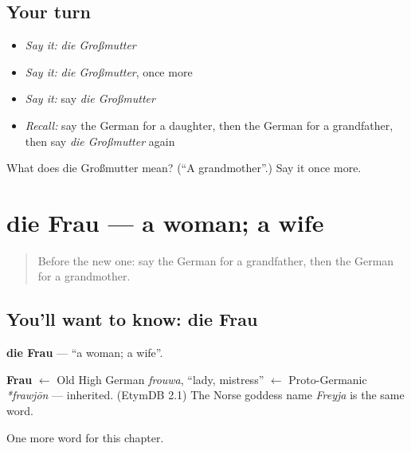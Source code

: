 \subsection*{Your turn}
\begin{itemize}
\raggedright
  \item \emph{Say it:} \emph{die Großmutter}
  \item \emph{Say it:} \emph{die Großmutter}, once more
  \item \emph{Say it:} say \emph{die Großmutter}
  \item \emph{Recall:} say the German for a daughter, then the German for a grandfather, then say \emph{die Großmutter} again
\end{itemize}

\begin{tcolorbox}[breakable,colback=teal!4,colframe=teal!35!black,title={Before you move on}]
What does die Großmutter mean? (\textquotedblleft{}A grandmother\textquotedblright{}.) Say it once more.
\end{tcolorbox}
\section[die Frau]{die Frau — a woman; a wife}

\label{lesson:GE-C62-frau}



\begin{quote}
Before the new one: say the German for a grandfather, then the German for a grandmother.
\end{quote}

\subsection*{You'll want to know: die Frau}
\textbf{die Frau} — \textquotedblleft{}a woman; a wife\textquotedblright{}.

\begin{cousinweb}
\textbf{Frau} $\leftarrow$ Old High German \emph{frouwa}, \textquotedblleft{}lady, mistress\textquotedblright{} $\leftarrow$ Proto-Germanic \emph{*frawjōn} — inherited. (EtymDB 2.1) The Norse goddess name \emph{Freyja} is the same word.
\end{cousinweb}

\begin{grammarlens}[title={What you've built}]
One more word for this chapter.
\end{grammarlens}

